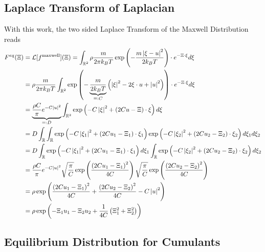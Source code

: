 \documentclass{article}
\begin{document}
\subsection{Laplace Transform of Laplacian}
\label{sub:Laplace Transform of Laplacian}
With this work, the two sided Laplace Transform of the Maxwell Distribution reads
\begin{equation}
  \begin{aligned}
    F^{eq}(\Xi) & = \mathcal{L}[f^{\text{maxwell}}](\Xi)
    = \int_{\mathbb{R}^2} \rho \frac{m}{2\pi k_B T} \exp \left( - \frac{m\left| \xi-u \right|^2}{2 k_B T}\right) \cdot e^{-\Xi\cdot\xi} d\xi \\
    & = \rho  \frac{m}{2\pi k_B T} \int_{\mathbb{R}^2}
      \exp \left( - \underbrace{\frac{m}{2 k_B T}}_{\mathrel{\mathop=}: C} \left( \left| \xi \right|^2 - 2\xi\cdot u + \left| u \right|^2 \right)\right) \cdot e^{-\Xi\cdot\xi} d\xi \\
    & = \underbrace{\frac{\rho C} {\pi} e^{-C \left| u \right|^2}}_{\mathrel{\mathop=}: D}
      \int_{\mathbb{R}^2}
      \exp \left( - C\left| \xi \right|^2 + (2Cu -\Xi)\cdot\xi \right) d\xi \\
    & =  D
      \int_{\mathbb{R}} \int_{\mathbb{R}}
      \exp \left( - C\left| \xi_1 \right|^2 + (2Cu_1 -\Xi_1)\cdot\xi_1 \right)
      \exp \left( - C\left| \xi_2 \right|^2 + (2Cu_2 -\Xi_2)\cdot\xi_2 \right) d\xi_1 d\xi_2 \\
    & = D
      \int_{\mathbb{R}}
      \exp \left( - C\left| \xi_1 \right|^2 + (2Cu_1 -\Xi_1)\cdot\xi_1 \right) d\xi_1
      \int_{\mathbb{R}}
      \exp \left( - C\left| \xi_2 \right|^2 + (2Cu_2 -\Xi_2)\cdot\xi_2 \right) d\xi_2 \\
    & = \frac{\rho C} {\pi} e^{-C \left| u \right|^2}
      \sqrt{\frac{\pi}{C}}\exp \left( \frac{{(2Cu_1-\Xi_1)}^2}{4C}\right)
      \sqrt{\frac{\pi}{C}}\exp \left( \frac{{(2Cu_2-\Xi_2)}^2}{4C}\right) \\
    & = \rho
      \exp \left( \frac{{(2Cu_1-\Xi_1)}^2}{4C} + \frac{{(2Cu_2-\Xi_2)}^2}{4C} -C \left| u \right|^2 \right) \\
    & = \rho
      \exp \left( -\Xi_1 u_1 - \Xi_2 u_2 + \frac{1}{4C}\left(\Xi_1^2 + \Xi_2^2 \right)\right)
  \end{aligned}
\end{equation}

\subsection{Equilibrium Distribution for Cumulants}
\label{sub:Equilibrium Distribution for Cumulants}
\end{document}
